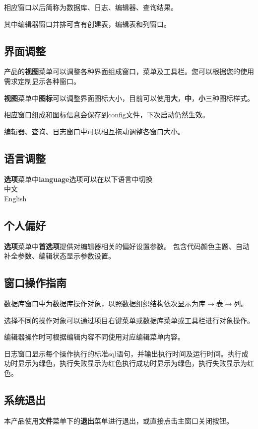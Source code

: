 相应窗口以后简称为数据库、日志、编辑器、查询结果。

其中编辑器窗口并排可含有创建表，编辑表和列窗口。

\subsection{界面调整}
\bigskip
产品的\textbf{视图}菜单可以调整各种界面组成窗口，菜单及工具栏。您可以根据您的使用需求定制显示各种窗口。

\textbf{视图}菜单中\textbf{图标}可以调整界面图标大小，目前可以使用\textbf{大}，\textbf{中}，\textbf{小}三种图标样式。

相应窗口组成和图标信息会保存到config文件，下次启动仍然生效。

编辑器、查询、日志窗口中可以相互拖动调整各窗口大小。

\subsection{语言调整}
\bigskip
\textbf{选项}菜单中\textbf{language}选项可以在以下语言中切换\\
\hspace*{1.5cm}中文\\
\hspace*{1.5cm}English

\subsection{个人偏好}
\bigskip

\textbf{选项}菜单中\textbf{首选项}提供对编辑器相关的偏好设置参数。
包含代码颜色主题、自动补全参数、编辑状态显示参数设置。

\subsection{窗口操作指南}
\bigskip

数据库窗口中为数据库操作对象，以照数据组织结构依次显示为库$\to$表$\to$列。

选择不同的操作对象可以通过项目右键菜单或数据库菜单或工具栏进行对象操作。

编辑器操作时可根据编辑内容不同使用对应编辑菜单内容。

日志窗口显示每个操作执行的标准sql语句，并输出执行时间及运行时间。执行成功时显示为绿色，执行失败显示为红色执行成功时显示为绿色，执行失败显示为红色。

\subsection{系统退出}
本产品使用\textbf{文件}菜单下的\textbf{退出}菜单进行退出，或直接点击主窗口关闭按钮。
